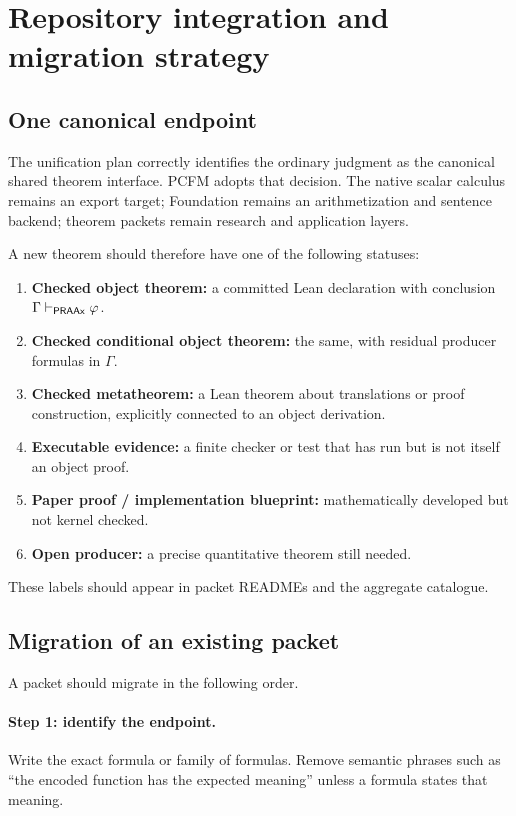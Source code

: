 
\section{Repository integration and migration strategy}
\label{sec:integration}

\subsection{One canonical endpoint}

The unification plan correctly identifies the ordinary
 judgment as the canonical shared theorem interface.  PCFM
adopts that decision.  The native scalar calculus remains an export target;
Foundation remains an arithmetization and sentence backend; theorem packets
remain research and application layers.

A new theorem should therefore have one of the following statuses:

\begin{enumerate}
\item \textbf{Checked object theorem:}
  a committed Lean declaration with conclusion
  \(\Gamma\vdash_{\mathsf{PRAAx}}\varphi\).
\item \textbf{Checked conditional object theorem:}
  the same, with residual producer formulas in \(\Gamma\).
\item \textbf{Checked metatheorem:}
  a Lean theorem about translations or proof construction, explicitly
  connected to an object derivation.
\item \textbf{Executable evidence:}
  a finite checker or test that has run but is not itself an object proof.
\item \textbf{Paper proof / implementation blueprint:}
  mathematically developed but not kernel checked.
\item \textbf{Open producer:}
  a precise quantitative theorem still needed.
\end{enumerate}

These labels should appear in packet READMEs and the aggregate catalogue.

\subsection{Migration of an existing packet}

A packet should migrate in the following order.

\paragraph{Step 1: identify the endpoint.}
Write the exact  formula or family of formulas.  Remove semantic
phrases such as ``the encoded function has the expected meaning'' unless a
formula states that meaning.

